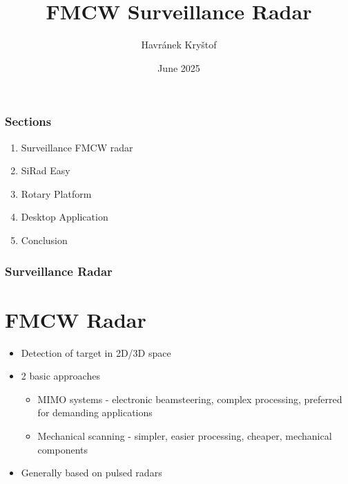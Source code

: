 \documentclass[aspectratio=43]{beamer}
\title{FMCW Surveillance Radar}
\author{Havránek Kryštof}
\date{June 2025}
\institute{České vysoké učení technické v Praze}
\begin{document}
\begin{frame}[plain]
  \maketitle
\end{frame}

\clearpage
\setcounter{framenumber}{0}

\begin{frame}[fragile]
  \frametitle{Sections}

  \begin{enumerate}
    \item Surveillance FMCW radar
    \item SiRad Easy
    \item Rotary Platform
    \item Desktop Application
    \item Conclusion
  \end{enumerate}
\end{frame}


\begin{frame}[fragile]
  \frametitle{Surveillance Radar}
  \section{FMCW Radar}

  \begin{itemize}
    \item Detection of target in 2D/3D space
    \item 2 basic approaches
      \begin{itemize}
        \item MIMO systems - electronic beamsteering, complex processing, preferred for demanding applications
        \item Mechanical scanning - simpler, easier processing, cheaper, mechanical components
      \end{itemize}
    \item Generally based on pulsed radars
  \end{itemize}
\end{frame}
\end{document}
